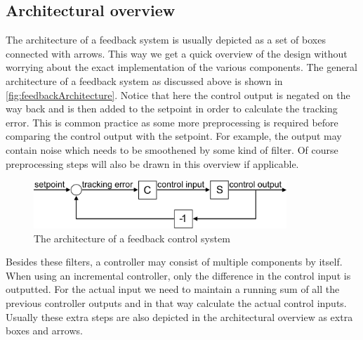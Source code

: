 \subsection{Architectural overview}
The architecture of a feedback system is usually depicted as a set of boxes connected with arrows. This way we get a quick overview of the design without worrying about the exact implementation of the various components. The general architecture of a feedback system as discussed above is shown in \autoref{fig:feedbackArchitecture}. Notice that here the control output is negated on the way back and is then added to the setpoint in order to calculate the tracking error. This is common practice as some more preprocessing is required before comparing the control output with the setpoint. For example, the output may contain noise which needs to be smoothened by some kind of filter. Of course preprocessing steps will also be drawn in this overview if applicable.

\begin{figure}[H]
	\begin{center}
		\includegraphics[width=0.85\textwidth]{figures/FeedbackBig.png}
	\end{center}
	\caption{The architecture of a feedback control system}
	\label{fig:feedbackArchitecture}
\end{figure}

Besides these filters, a controller may consist of multiple components by itself. When using an incremental controller, only the difference in the control input is outputted. For the actual input we need to maintain a running sum of all the previous controller outputs and in that way calculate the actual control inputs. Usually these extra steps are also depicted in the architectural overview as extra boxes and arrows.
